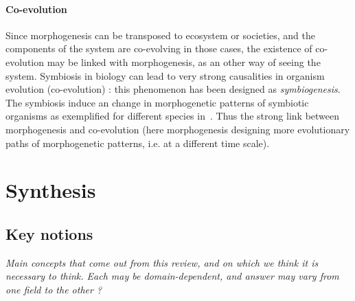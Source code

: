 \documentclass[fleqn,10pt]{wlscirep}
\begin{document}
\paragraph{Co-evolution}

Since morphogenesis can be transposed to ecosystem or societies, and the components of the system are co-evolving in those cases, the existence of co-evolution may be linked with morphogenesis, as an other way of seeing the system. Symbiosis in biology can lead to very strong causalities in organism evolution (co-evolution) : this phenomenon has been designed as \emph{symbiogenesis}. The symbiosis induce an change in morphogenetic patterns of symbiotic organisms as exemplified for different species in~\cite{chapman1998morphogenesis}. Thus the strong link between morphogenesis and co-evolution (here morphogenesis designing more evolutionary paths of morphogenetic patterns, i.e. at a different time scale).






\section*{Synthesis}

\subsection*{Key notions}

\textit{Main concepts that come out from this review, and on which we think it is necessary to think. Each may be domain-dependent, and answer may vary from one field to the other ?}
\end{document}
